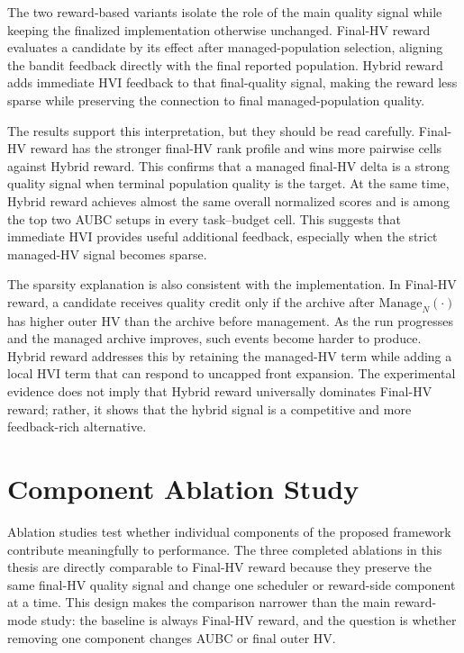 The two reward-based variants isolate the role of the main quality signal while keeping the finalized implementation otherwise unchanged. Final-HV reward evaluates a candidate by its effect after managed-population selection, aligning the bandit feedback directly with the final reported population. Hybrid reward adds immediate HVI feedback to that final-quality signal, making the reward less sparse while preserving the connection to final managed-population quality.

The results support this interpretation, but they should be read carefully. Final-HV reward has the stronger final-HV rank profile and wins more pairwise cells against Hybrid reward. This confirms that a managed final-HV delta is a strong quality signal when terminal population quality is the target. At the same time, Hybrid reward achieves almost the same overall normalized scores and is among the top two AUBC setups in every task--budget cell. This suggests that immediate HVI provides useful additional feedback, especially when the strict managed-HV signal becomes sparse.

The sparsity explanation is also consistent with the implementation. In Final-HV reward, a candidate receives quality credit only if the archive after $\mathrm{Manage}_N(\cdot)$ has higher outer HV than the archive before management. As the run progresses and the managed archive improves, such events become harder to produce. Hybrid reward addresses this by retaining the managed-HV term while adding a local HVI term that can respond to uncapped front expansion. The experimental evidence does not imply that Hybrid reward universally dominates Final-HV reward; rather, it shows that the hybrid signal is a competitive and more feedback-rich alternative.

\section{Component Ablation Study}

Ablation studies test whether individual components of the proposed framework contribute meaningfully to performance. The three completed ablations in this thesis are directly comparable to Final-HV reward because they preserve the same final-HV quality signal and change one scheduler or reward-side component at a time. This design makes the comparison narrower than the main reward-mode study: the baseline is always Final-HV reward, and the question is whether removing one component changes AUBC or final outer HV.

